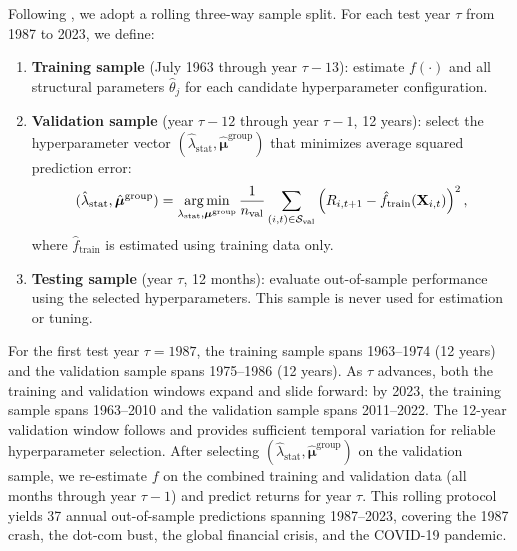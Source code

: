 Following \citet{gu2020empirical}, we adopt a rolling three-way sample split.
For each test year $\tau$ from 1987 to 2023, we define:
\begin{enumerate}
\item \textbf{Training sample} (July 1963 through year $\tau - 13$): estimate $f(\cdot)$ and all structural parameters $\hat{\theta}_j$ for each candidate hyperparameter configuration.
\item \textbf{Validation sample} (year $\tau - 12$ through year $\tau - 1$, 12 years): select the hyperparameter vector $(\hat{\lambda}_{\mathrm{stat}}, \hat{\bm{\mu}}^{\mathrm{group}})$ that minimizes average squared prediction error:
\begin{equation}\label{eq:cv_criterion}
(\hat{\lambda}_{\mathrm{stat}}, \hat{\bm{\mu}}^{\mathrm{group}}) = \operatorname*{arg\,min}_{\lambda_{\mathrm{stat}}, \bm{\mu}^{\mathrm{group}}} \frac{1}{n_{\mathrm{val}}}\sum_{(i,t) \in \mathcal{S}_{\mathrm{val}}} \left(R_{i,t+1} - \hat{f}_{\mathrm{train}}(\mathbf{X}_{i,t})\right)^2,
\end{equation}
where $\hat{f}_{\mathrm{train}}$ is estimated using training data only.
\item \textbf{Testing sample} (year $\tau$, 12 months): evaluate out-of-sample performance using the selected hyperparameters.
This sample is never used for estimation or tuning.
\end{enumerate}
For the first test year $\tau = 1987$, the training sample spans 1963--1974 (12 years) and the validation sample spans 1975--1986 (12 years).
As $\tau$ advances, both the training and validation windows expand and slide forward: by 2023, the training sample spans 1963--2010 and the validation sample spans 2011--2022.
The 12-year validation window follows \citet{gu2020empirical} and provides sufficient temporal variation for reliable hyperparameter selection.
After selecting $(\hat{\lambda}_{\mathrm{stat}}, \hat{\bm{\mu}}^{\mathrm{group}})$ on the validation sample, we re-estimate $f$ on the combined training and validation data (all months through year $\tau - 1$) and predict returns for year $\tau$.
This rolling protocol yields 37 annual out-of-sample predictions spanning 1987--2023, covering the 1987 crash, the dot-com bust, the global financial crisis, and the COVID-19 pandemic.

